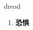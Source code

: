 
\begin{frame}
{\huge dread}
\begin{center}
\begin{enumerate}\Large
  \item \textbf{恐惧}
\end{enumerate}
\end{center}
\end{frame}

